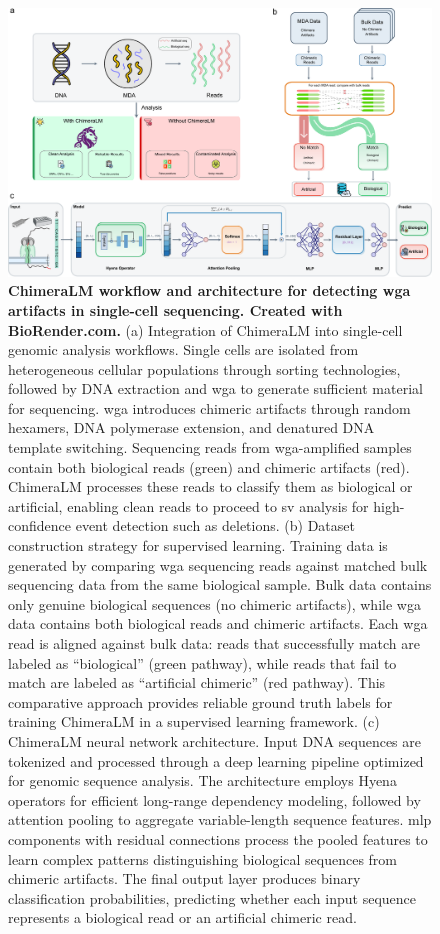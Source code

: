 \documentclass[pdflatex,sn-nature]{sn-jnl}%
\theoremstyle{thmstyleone}%
\theoremstyle{thmstyletwo}%
\theoremstyle{thmstylethree}%
\begin{document}
\begin{figure}[!ht]
	\begin{center}
		\includegraphics[width=\textwidth]{final_figures/figure1}
	\end{center}
	\caption{{\bf ChimeraLM workflow and architecture for detecting \gls{wga} artifacts in single-cell sequencing. Created with BioRender.com.}
		(a) Integration of ChimeraLM into single-cell genomic analysis workflows. Single cells are isolated from heterogeneous cellular populations through sorting technologies, followed by DNA extraction and \gls{wga} to generate sufficient material for sequencing. \gls{wga} introduces chimeric artifacts through random hexamers, DNA polymerase extension, and denatured DNA template switching. Sequencing reads from \gls{wga}-amplified samples contain both biological reads (green) and chimeric artifacts (red). ChimeraLM processes these reads to classify them as biological or artificial, enabling clean reads to proceed to \gls{sv} analysis for high-confidence event detection such as deletions.
		(b) Dataset construction strategy for supervised learning. Training data is generated by comparing \gls{wga} sequencing reads against matched bulk sequencing data from the same biological sample. Bulk data contains only genuine biological sequences (no chimeric artifacts), while \gls{wga} data contains both biological reads and chimeric artifacts. Each \gls{wga} read is aligned against bulk data: reads that successfully match are labeled as ``biological'' (green pathway), while reads that fail to match are labeled as ``artificial chimeric'' (red pathway). This comparative approach provides reliable ground truth labels for training ChimeraLM in a supervised learning framework.
		(c) ChimeraLM neural network architecture. Input DNA sequences are tokenized and processed through a deep learning pipeline optimized for genomic sequence analysis. The architecture employs Hyena operators for efficient long-range dependency modeling, followed by attention pooling to aggregate variable-length sequence features. \gls{mlp} components with residual connections process the pooled features to learn complex patterns distinguishing biological sequences from chimeric artifacts. The final output layer produces binary classification probabilities, predicting whether each input sequence represents a biological read or an artificial chimeric read.} \label{fig:figure1}
\end{figure}
\end{document}
